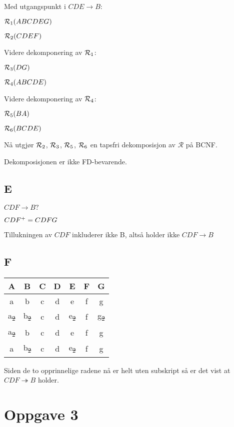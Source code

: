 \documentclass[12pt,norsk,a4paper]{article}
\begin{document}
Med utgangspunkt i $CDE \rightarrow B$:

$\mathcal{R\textsubscript{1}}(ABCDEG)$

$\mathcal{R\textsubscript{2}}(CDEF)$

Videre dekomponering av $\mathcal{R\textsubscript{1}}$:

$\mathcal{R\textsubscript{3}}(DG)$

$\mathcal{R\textsubscript{4}}(ABCDE)$

Videre dekomponering av $\mathcal{R\textsubscript{4}}$:

$\mathcal{R\textsubscript{5}}(BA)$

$\mathcal{R\textsubscript{6}}(BCDE)$

Nå utgjør $\mathcal{R\textsubscript{2}}$, $\mathcal{R\textsubscript{3}}$, $\mathcal{R\textsubscript{5}}$, $\mathcal{R\textsubscript{6}}$ en tapsfri dekomposisjon av $\mathcal{R}$ på BCNF.

Dekomposisjonen er ikke FD-bevarende.



\subsection*{E}
$CDF \rightarrow B?$

$CDF\textsuperscript{+} = CDFG$

Tillukningen av $CDF$ inkluderer ikke B, altså holder ikke $CDF \rightarrow B$

\subsection*{F}
\begin{tabular}{c | c | c | c | c | c | c}
A & B & C & D & E & F & G\\
\hline
a & b & c & d & e & f & g \\
\hline
a\textsubscript{\sout{2}} & b\textsubscript{\sout{2}} & c & d & e\textsubscript{\sout{2}} & f & g\textsubscript{\sout{2}} \\
\hline
a\textsubscript{\sout{2}} & b & c & d & e & f & g \\
\hline
a & b\textsubscript{\sout{2}} & c & d & e\textsubscript{\sout{2}} & f & g \\
\end{tabular}

Siden de to opprinnelige radene nå er helt uten subskript så er det vist at $CDF \twoheadrightarrow B$ holder.

\section*{Oppgave 3}
\end{document}

